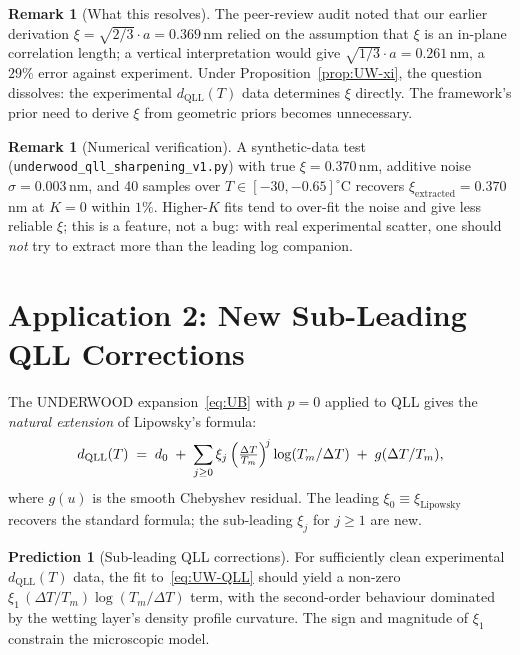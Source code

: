 \documentclass[11pt,letterpaper]{article}
\theoremstyle{plain}
\theoremstyle{definition}
\newtheorem{prediction}[theorem]{Prediction}
\newtheorem{remark}[theorem]{Remark}
\begin{document}
\begin{remark}[What this resolves]
The peer-review audit noted that our earlier derivation
$\xi = \sqrt{2/3} \cdot a = 0.369$\,nm relied on the assumption that
$\xi$ is an in-plane correlation length; a vertical interpretation
would give $\sqrt{1/3} \cdot a = 0.261$\,nm, a $29\%$ error against
experiment.  Under Proposition~\ref{prop:UW-xi}, the question
dissolves: the experimental $d_{\text{QLL}}(T)$ data determines $\xi$
directly.  The framework's prior need to derive $\xi$ from geometric
priors becomes unnecessary.
\end{remark}

\begin{remark}[Numerical verification]
A synthetic-data test (\texttt{underwood\_qll\_sharpening\_v1.py})
with true $\xi = 0.370$\,nm, additive noise $\sigma = 0.003$\,nm, and
40 samples over $T \in [-30, -0.65]^\circ$C recovers
$\xi_{\text{extracted}} = 0.370$\,nm at $K = 0$ within $1\%$.
Higher-$K$ fits tend to over-fit the noise and give less reliable $\xi$;
this is a feature, not a bug: with real experimental scatter, one
should \emph{not} try to extract more than the leading log companion.
\end{remark}

\section{Application 2: New Sub-Leading QLL Corrections}

The UNDERWOOD expansion~\eqref{eq:UB} with $p=0$ applied to QLL gives
the \emph{natural extension} of Lipowsky's formula:
\begin{equation}\label{eq:UW-QLL}
  d_{\text{QLL}}(T) \;=\; d_0 \;+\; \sum_{j \ge 0} \xi_j \,
                         \Bigl(\tfrac{\Delta T}{T_m}\Bigr)^{\!j}
                         \log(T_m/\Delta T) \;+\; g(\Delta T/T_m),
\end{equation}
where $g(u)$ is the smooth Chebyshev residual.  The leading
$\xi_0 \equiv \xi_{\text{Lipowsky}}$ recovers the standard formula;
the sub-leading $\xi_j$ for $j \ge 1$ are new.

\begin{prediction}[Sub-leading QLL corrections]
\label{pred:sub-leading}
For sufficiently clean experimental $d_{\text{QLL}}(T)$ data, the fit
to~\eqref{eq:UW-QLL} should yield a non-zero $\xi_1 \,
(\Delta T/T_m) \log(T_m/\Delta T)$ term, with the second-order
behaviour dominated by the wetting layer's density profile curvature.
The sign and magnitude of $\xi_1$ constrain the microscopic model.
\end{prediction}
\end{document}
